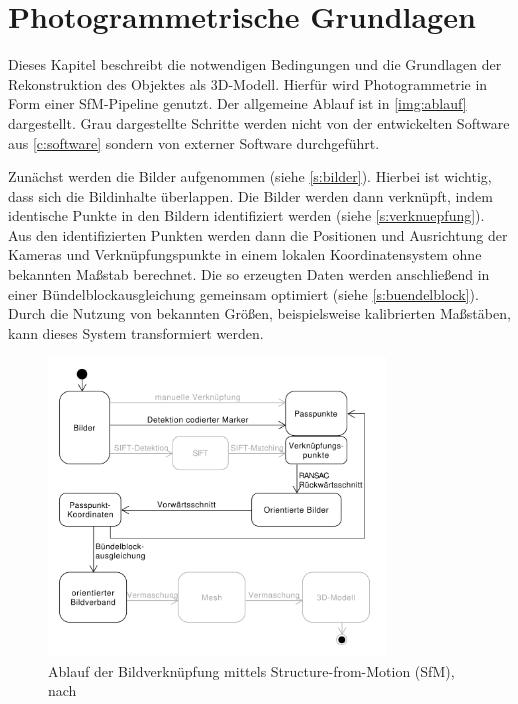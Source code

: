 \documentclass[./00PhotoBox.tex]{subfiles}
\begin{document}
\chapter{Photogrammetrische Grundlagen}
\label{c:photogrammetrie}
Dieses Kapitel beschreibt die notwendigen Bedingungen und die Grundlagen der Rekonstruktion des Objektes als 3D-Modell. Hierfür wird Photogrammetrie in Form einer SfM-Pipeline genutzt. Der allgemeine Ablauf ist in \autoref{img:ablauf} dargestellt. Grau dargestellte Schritte werden nicht von der entwickelten Software aus \autoref{c:software} sondern von externer Software durchgeführt.

Zunächst werden die Bilder aufgenommen (siehe \autoref{s:bilder}). Hierbei ist wichtig, dass sich die Bildinhalte überlappen. Die Bilder werden dann verknüpft, indem identische Punkte in den Bildern identifiziert werden  (siehe \autoref{s:verknuepfung}).
Aus den identifizierten Punkten werden dann die Positionen und Ausrichtung der Kameras und Verknüpfungspunkte in einem lokalen Koordinatensystem ohne bekannten Maßstab berechnet. Die so erzeugten Daten werden anschließend in einer Bündelblockausgleichung gemeinsam optimiert (siehe \autoref{s:buendelblock}). Durch die Nutzung von bekannten Größen, beispielsweise kalibrierten Maßstäben, kann dieses System transformiert werden.

\begin{figure}
    \centering
    \includegraphics[width=0.8\textwidth]{./img/uml/uml_ablauf.pdf}
    \caption{Ablauf der Bildverknüpfung mittels Structure-from-Motion (SfM), nach \citealt[S. 492]{luhmann}} %
    \label{img:ablauf} %
\end{figure}
\end{document}
